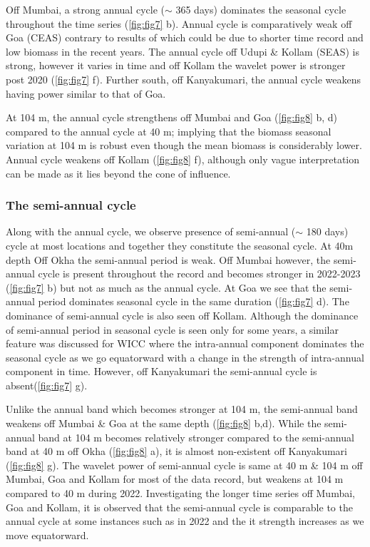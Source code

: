\documentclass{article}
\begin{document}
	Off Mumbai, a strong annual cycle ($\sim$ 365 days) dominates the seasonal cycle throughout the time series (\cref{fig:fig7} b). Annual cycle is comparatively weak off Goa (CEAS) contrary to results of \citep{aparna2022seasonal} which could be due to shorter time record and low biomass in the recent years. The annual cycle off Udupi \& Kollam (SEAS) is strong, however it varies in time and off Kollam the wavelet power is stronger post 2020 (\cref{fig:fig7} f). Further south, off Kanyakumari, the annual cycle weakens having power similar to that of Goa.
	
	At 104 m, the annual cycle strengthens off Mumbai and Goa (\cref{fig:fig8} b, d) compared to the annual cycle at 40 m; implying that the biomass seasonal variation at 104 m is robust even though the mean biomass is considerably lower. Annual cycle weakens off Kollam (\cref{fig:fig8} f), although only vague interpretation can be made as it lies beyond the cone of influence. 
	
	\subsubsection{The semi-annual cycle}
	
	Along with the annual cycle, we observe presence of semi-annual ($\sim$ 180 days) cycle at most locations and together they constitute the seasonal cycle. At 40m depth Off Okha the semi-annual period is weak. Off Mumbai however, the semi-annual cycle is present throughout the record and becomes stronger in 2022-2023 (\cref{fig:fig7} b) but not as much as the annual cycle. At Goa we see that the semi-annual period dominates seasonal cycle in the same duration (\cref{fig:fig7} d). The dominance of semi-annual cycle is also seen off Kollam. Although the dominance of semi-annual period in seasonal cycle is seen only for some years, a similar feature was discussed for WICC \citep{chaudhuri2020observed} where the intra-annual component dominates the seasonal cycle as we go equatorward with a change in the strength of intra-annual component in time. However, off Kanyakumari the semi-annual cycle is absent(\cref{fig:fig7} g).
	
	Unlike the annual band which becomes stronger at 104 m, the semi-annual band weakens off Mumbai \& Goa at the same depth (\cref{fig:fig8} b,d). While the semi-annual band at 104 m becomes relatively stronger compared to the semi-annual band at 40 m off Okha (\cref{fig:fig8} a), it is almost non-existent off Kanyakumari (\cref{fig:fig8} g). The wavelet power of semi-annual cycle is same at 40 m \& 104 m off Mumbai, Goa and Kollam for most of the data record, but weakens at 104 m compared to 40 m during 2022. Investigating the longer time series off Mumbai, Goa and Kollam, it is observed that the semi-annual cycle is comparable to the annual cycle at some instances such as in 2022 and the it strength increases as we move equatorward.
\end{document}

